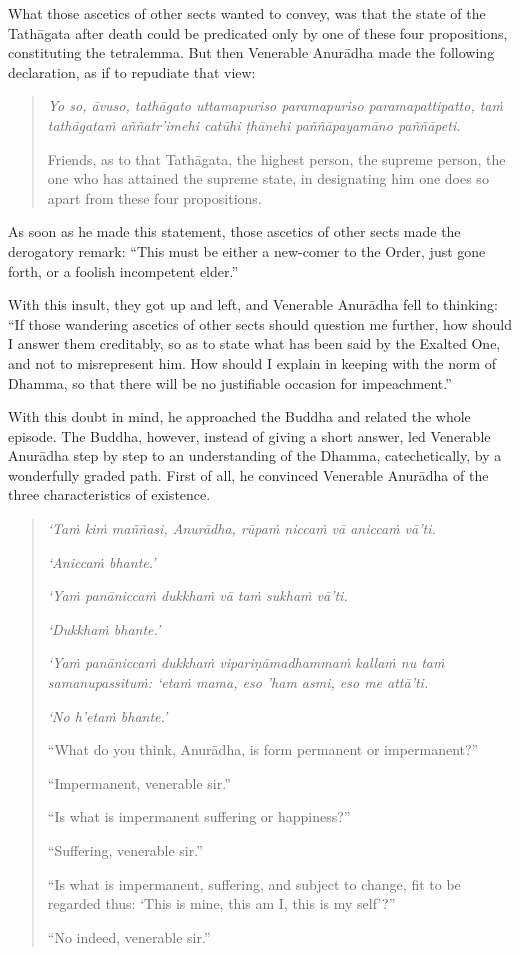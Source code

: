 What those ascetics of other sects wanted to convey, was that the state of the Tathāgata after death could be predicated only by one of these four propositions, constituting the tetralemma. But then Venerable Anurādha made the following declaration, as if to repudiate that view:

\begin{quote}
\emph{Yo so, āvuso, tathāgato uttamapuriso paramapuriso paramapattipatto, taṁ tathāgataṁ aññatr'imehi catūhi ṭhānehi paññāpayamāno paññāpeti.}

Friends, as to that Tathāgata, the highest person, the supreme person, the one who has attained the supreme state, in designating him one does so apart from these four propositions.
\end{quote}

As soon as he made this statement, those ascetics of other sects made the derogatory remark: ``This must be either a new-comer to the Order, just gone forth, or a foolish incompetent elder.''

With this insult, they got up and left, and Venerable Anurādha fell to thinking: ``If those wandering ascetics of other sects should question me further, how should I answer them creditably, so as to state what has been said by the Exalted One, and not to misrepresent him. How should I explain in keeping with the norm of Dhamma, so that there will be no justifiable occasion for impeachment.''

With this doubt in mind, he approached the Buddha and related the whole episode. The Buddha, however, instead of giving a short answer, led Venerable Anurādha step by step to an understanding of the Dhamma, catechetically, by a wonderfully graded path. First of all, he convinced Venerable Anurādha of the three characteristics of existence.

\begin{quote}
\emph{`Taṁ kiṁ maññasi, Anurādha, rūpaṁ niccaṁ vā aniccaṁ vā'ti.}

\emph{`Aniccaṁ bhante.'}

\emph{`Yaṁ panāniccaṁ dukkhaṁ vā taṁ sukhaṁ vā'ti.}

\emph{`Dukkhaṁ bhante.'}

\emph{`Yaṁ panāniccaṁ dukkhaṁ vipariṇāmadhammaṁ kallaṁ nu taṁ samanupassituṁ: `etaṁ mama, eso 'ham asmi, eso me attā'ti.}

\emph{`No h'etaṁ bhante.'}

``What do you think, Anurādha, is form permanent or impermanent?''

``Impermanent, venerable sir.''

``Is what is impermanent suffering or happiness?''

``Suffering, venerable sir.''

``Is what is impermanent, suffering, and subject to change, fit to be regarded thus: `This is mine, this am I, this is my self'?''

``No indeed, venerable sir.''
\end{quote}

